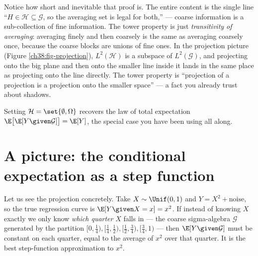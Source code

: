 \begin{happeningbox}
Notice how short and inevitable that proof is. The entire content is the single line ``$H \in
\mathcal{H} \subseteq \mathcal{G}$, so the averaging set is legal for both,'' --- coarse information
is a sub-collection of fine information. The tower property is just \emph{transitivity of
averaging}: averaging finely and then coarsely is the same as averaging coarsely once, because the
coarse blocks are unions of fine ones. In the projection picture (Figure
\ref{ch38:fig-projection}), $L^2(\mathcal{H})$ is a subspace of $L^2(\mathcal{G})$, and projecting
onto the big plane and then onto the smaller line inside it lands in the same place as projecting onto
the line directly. The tower property is ``projection of a projection is a projection onto the
smaller space'' --- a fact you already trust about shadows.
\end{happeningbox}

Setting $\mathcal{H} = \set{\emptyset, \Omega}$ recovers the law of total expectation
$\E\big[\E[Y\given\mathcal{G}]\big] = \E[Y]$, the special case you have been using all along.

\section{A picture: the conditional expectation as a step function}
\label{ch38:step-figure}

Let us see the projection concretely. Take $X \sim \Unif(0,1)$ and $Y = X^2 + \text{noise}$, so the
true regression curve is $\E[Y\given X = x] = x^2$. If instead of knowing $X$ exactly we only know
\emph{which quarter} $X$ falls in --- the coarse sigma-algebra $\mathcal{G}$ generated by the
partition $[0,\tfrac14), [\tfrac14,\tfrac12), [\tfrac12,\tfrac34), [\tfrac34,1)$ --- then
$\E[Y\given\mathcal{G}]$ must be constant on each quarter, equal to the average of $x^2$ over that
quarter. It is the best step-function approximation to $x^2$.

